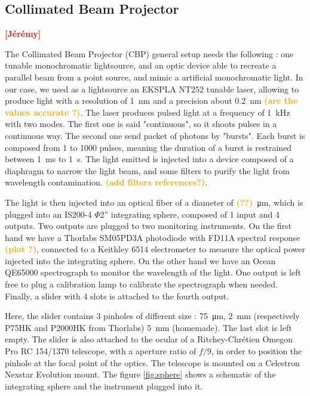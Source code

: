 \documentclass[onecolumn]{aa}
\newcommand{\todo}[1]{\textbf{\textcolor{red}{[#1]}}\xspace}
\newcommand{\com}[1]{\textbf{\textcolor{orange}{(#1)}}\xspace}
\begin{document}
\subsection{Collimated Beam Projector}
\label{sec:cbp}

\todo{Jérémy}

The Collimated Beam Projector (CBP) general setup needs the following : one tunable monochromatic lightsource, and an optic device able to recreate a parallel beam from a point source, and mimic a artificial monochromatic light. In our case, we used as a lightsource an EKSPLA NT252 tunable laser, allowing to produce light with a resolution of \SI{1}{\nano\meter}  and a precision about \SI{0.2}{\nano\meter} \com{are the values accurate ?}. The laser produces pulsed light at a frequency of \SI{1}{\kilo\hertz} with two modes. The first one is said "continuous", so it shoots pulses in a continuous way. The second one send packet of photons by "bursts". Each burst is composed from 1 to 1000 pulses, meaning the duration of a burst is restrained between \SI{1}{\milli\second} to \SI{1}{\second}. The light emitted is injected into a device composed of a diaphragm to narrow the light beam, and some filters to purify the light from wavelength contamination. \com{add filters references?}. 

\noindent The light is then injected into an optical fiber of a diameter of \com{??}\SI{}{\micro\meter}, which is plugged into an IS200-4 $\Phi$2'' integrating sphere, composed of 1 input and 4 outputs. Two outputs are plugged to two monitoring instruments. On the first hand we have a Thorlabs SM05PD3A photodiode with FD11A spectral response \com{plot ?}, connected to a Keithley 6514 electrometer to measure the optical power injected into the integrating sphere. On the other hand we have an Ocean QE65000 spectrograph to monitor the wavelength of the light. One output is left free to plug a calibration lamp to calibrate the spectrograph when needed. Finally, a slider with 4 slots is attached to the fourth output. 

\noindent Here, the slider contains 3 pinholes of different size : \SI{75}{\micro\meter}, \SI{2}{\milli\meter} (respectively P75HK and P2000HK from Thorlabs) \SI{5}{\milli\meter} (homemade). The last slot is left empty. The slider is also attached to the ocular of a Ritchey-Chrétien Omegon Pro RC 154/1370 telescope, with a aperture ratio of $f/9$, in order to position the pinhole at the focal point of the optics. The telescope is mounted on a Celestron Nexstar Evolution mount. The figure \ref{fig:sphere} shows a schematic of the integrating sphere and the instrument plugged into it. \\
\end{document}
